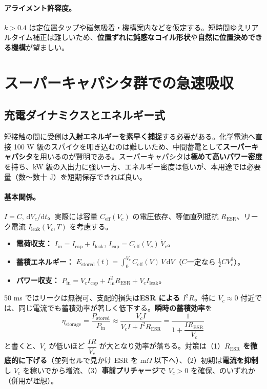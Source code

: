 \documentclass[11pt]{ctexart}
\begin{document}
\paragraph{アライメント許容度。} $k>0.4$ は定位置タップや磁気吸着・機構案内などを仮定する。短時間ゆえリアルタイム補正は難しいため、\textbf{位置ずれに鈍感なコイル形状}や\textbf{自然に位置決めできる機構}が望ましい。

\section{スーパーキャパシタ群での急速吸収}
\subsection{充電ダイナミクスとエネルギー式}
短接触の間に受側は\textbf{入射エネルギーを素早く捕捉}する必要がある。化学電池へ直接 100 W 級のスパイクを叩き込むのは難しいため、中間蓄電として\textbf{スーパーキャパシタ}を用いるのが賢明である。スーパーキャパシタは\textbf{極めて高いパワー密度}を持ち、kW 級の入出力に強い一方、エネルギー密度は低いが、本用途では必要量（数〜数十 J）を短期保存できれば良い。

\paragraph{基本関係。} $I=C,\,\mathrm{d}V_c/\mathrm{d}t$。実際には容量 $C_{\mathrm{eff}}(V_c)$ の電圧依存、等価直列抵抗 $R_{\mathrm{ESR}}$、リーク電流 $I_{\mathrm{leak}}(V_c,T)$ を考慮する。
\begin{itemize}
  \item \textbf{電荷収支：} $I_{\mathrm{in}}=I_{\mathrm{cap}}+I_{\mathrm{leak}}$, $I_{\mathrm{cap}}=C_{\mathrm{eff}}(V_c)\,\dot V_c$。
  \item \textbf{蓄積エネルギー：} $E_{\mathrm{stored}}(t)=\int_0^{V_c} C_{\mathrm{eff}}(V)\,V\,\mathrm{d}V$（$C$一定なら $\tfrac12 C V_c^2$）。
  \item \textbf{パワー収支：} $P_{\mathrm{in}}=V_c I_{\mathrm{cap}}+I_{\mathrm{in}}^2R_{\mathrm{ESR}}+V_c I_{\mathrm{leak}}$。
\end{itemize}
50 ms ではリークは無視可、支配的損失は\textbf{ESR による $I^2R$}。特に $V_c\approx0$ 付近では、同じ電流でも蓄積効率が著しく低下する。\textbf{瞬時の蓄積効率}を
\begin{equation}
\eta_{\mathrm{storage}}=\frac{P_{\mathrm{stored}}}{P_{\mathrm{in}}}\approx\frac{V_c I}{V_c I+I^2R_{\mathrm{ESR}}}=\frac{1}{1+\dfrac{I R_{\mathrm{ESR}}}{V_c}}
\end{equation}
と書くと、$V_c$ が低いほど $\dfrac{IR}{V_c}$ が大となり効率が落ちる。対策は（1）\textbf{$R_{\mathrm{ESR}}$ を徹底的に下げる}（並列セルで見かけ ESR を m$\Omega$ 以下へ）、（2）初期は\textbf{電流を抑制}し $V_c$ を稼いでから増流、（3）\textbf{事前プリチャージ}で $V_c>0$ を確保、のいずれか（併用が理想）。
\end{document}
